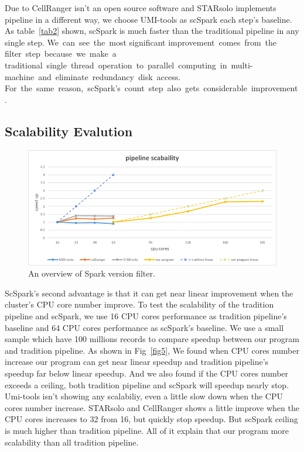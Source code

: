 \documentclass[runningheads]{llncs}
\begin{document}
Due to CellRanger isn't an open source software and STARsolo implements pipeline in a different way, we choose UMI-tools as scSpark each step's baseline.
As table~\ref{tab2} shown, scSpark is much faster than the traditional pipeline in any single step.
We can see the most significant improvement comes from the filter step because we make a traditional single thread operation to parallel computing in multi-machine and eliminate redundancy disk access.
For the same reason, scSpark's count step also gets considerable improvement.

\subsection{Scalability Evalution}
\begin{figure}
  \includegraphics[width=\textwidth]{fig4.png}
  \caption{An overview of Spark version filter.} \label{fig4}
\end{figure}
ScSpark's second advantage is that it can get near linear improvement when the cluster's CPU core number improve.
To test the scalability of the tradition pipeline and scSpark, we use 16 CPU cores performance as tradition pipeline's baseline and 64 CPU cores performance as scSpark's baseline.
We use a small sample which have 100 millions records to compare speedup between our program and tradition pipeline.
As shown in Fig~\ref{fig5}, We found when CPU cores number increase our program can get near linear speedup and tradition pipeline's speedup far below linear speedup.
And we also found if the CPU cores number exceeds a ceiling, both tradition pipeline and scSpark will speedup nearly stop.
Umi-tools isn't showing any scalabiliy, even a little slow down when the CPU cores number increase.
STARsolo and CellRanger shows a little improve when the CPU cores increases to 32 from 16, but quickly stop speedup.
But scSpark ceiling is much higher than tradition pipeline.
All of it explain that our program more scalability than all tradition pipeline.
\end{document}
